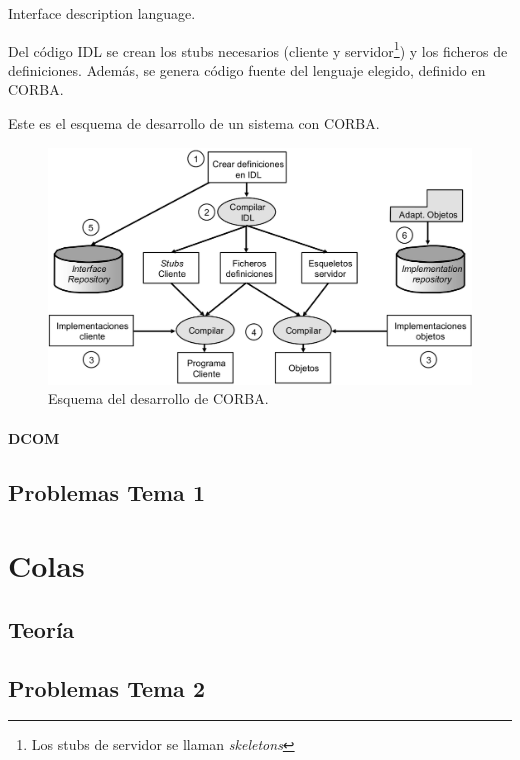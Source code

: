 \documentclass{apuntes}[nochap]
\begin{document}
\begin{defn}[IDL]
Interface description language.
\end{defn}

Del código IDL se crean los stubs necesarios (cliente y servidor\footnote{Los stubs de servidor se llaman \textit{skeletons}}) y los ficheros de definiciones. Además, se genera código fuente del lenguaje elegido, definido en CORBA.

Este es el esquema de desarrollo de un sistema con CORBA.


\begin{figure}[hbtp]
\centering
\includegraphics[width=1\textwidth]{img/CORBA.png}
\caption{Esquema del desarrollo de CORBA.}
\label{OMA}
\end{figure}

\subsubsection{DCOM}

\section{Problemas Tema 1}
\newpage

\chapter{Colas}
\section{Teoría}
\section{Problemas Tema 2}

\end{document}

